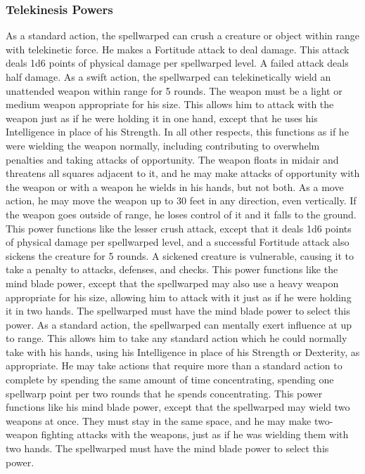 \subsubsection{Telekinesis Powers}
 As a standard action, the spellwarped can crush a creature or object within \rngclose range with telekinetic force. He makes a Fortitude attack to deal damage. This attack deals 1d6 points of physical damage  per spellwarped level. A failed attack deals half damage.
 As a swift action, the spellwarped can telekinetically wield an unattended weapon within \rngclose range for 5 rounds. The weapon must be a light or medium weapon appropriate for his size. This allows him to attack with the weapon just as if he were holding it in one hand, except that he uses his Intelligence in place of his Strength. In all other respects, this functions as if he were wielding the weapon normally, including contributing to overwhelm penalties and taking attacks of opportunity. The weapon floats in midair and threatens all squares adjacent to it, and he may make attacks of opportunity with the weapon or with a weapon he wields in his hands, but not both.
As a move action, he may move the weapon up to 30 feet in any direction, even vertically. If the weapon goes outside of \rngclose range, he loses control of it and it falls to the ground.
 This power functions like the lesser crush attack, except that it deals 1d6 points of physical damage per spellwarped level, and a successful Fortitude attack also sickens the creature for 5 rounds. A sickened creature is vulnerable, causing it to take a  penalty to attacks, defenses, and checks.
 This power functions like the mind blade power, except that the spellwarped may also use a heavy weapon appropriate for his size, allowing him to attack with it just as if he were holding it in two hands. The spellwarped must have the mind blade power to select this power.
 As a standard action, the spellwarped can mentally exert influence at up to \rngclose range. This allows him to take any standard action which he could normally take with his hands, using his Intelligence in place of his Strength or Dexterity, as appropriate. He may take actions that require more than a standard action to complete by spending the same amount of time concentrating, spending one spellwarp point per two rounds that he spends concentrating.
 This power functions like his mind blade power, except that the spellwarped may wield two weapons at once. They must stay in the same space, and he may make two-weapon fighting attacks with the weapons, just as if he was wielding them with two hands. The spellwarped must have the mind blade power to select this power.
